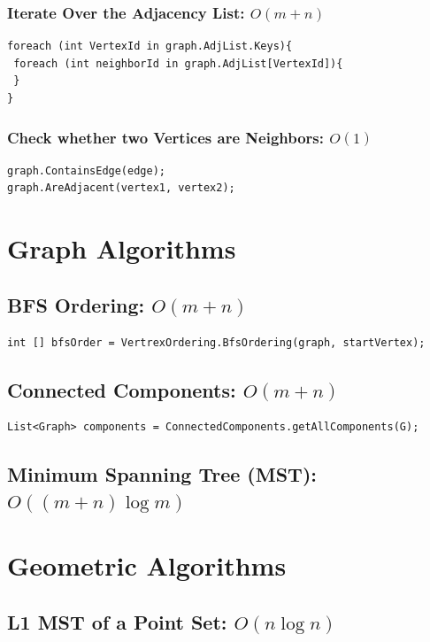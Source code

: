 \documentclass{article}
\begin{document}
\subsubsection{Iterate Over the Adjacency List: $O(m+n)$}
\begin{lstlisting}
foreach (int VertexId in graph.AdjList.Keys){
 foreach (int neighborId in graph.AdjList[VertexId]){
 }                
}
\end{lstlisting}


\subsubsection{Check whether two Vertices are Neighbors: $O(1)$}
\begin{lstlisting}
graph.ContainsEdge(edge);
graph.AreAdjacent(vertex1, vertex2);
\end{lstlisting}

\newpage
\section{Graph Algorithms}

\subsection{BFS Ordering: $O(m+n)$}
\begin{lstlisting}
int [] bfsOrder = VertrexOrdering.BfsOrdering(graph, startVertex);
\end{lstlisting}

\subsection{Connected Components: $O(m+n)$}
\begin{lstlisting}
List<Graph> components = ConnectedComponents.getAllComponents(G);
\end{lstlisting}


\subsection{Minimum Spanning Tree (MST): $O((m+n)\log m)$}

\newpage
\section{Geometric Algorithms}
\subsection{L1 MST of a Point Set: $O(n\log n)$}
\end{document}
